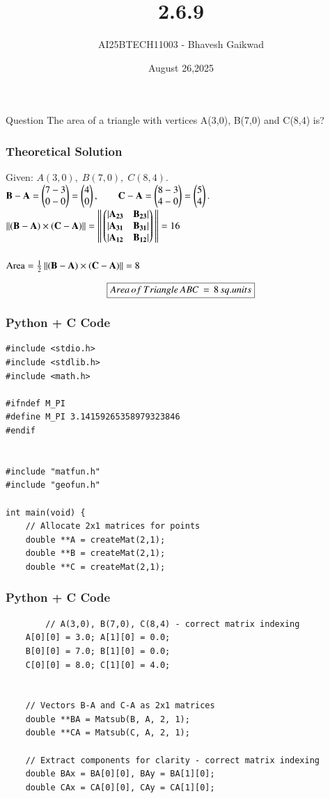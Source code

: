 \documentclass{beamer}
\title
{2.6.9}
\date{August 26,2025}
\author 
{AI25BTECH11003 - Bhavesh Gaikwad}
\begin{document}
\frame{\titlepage}
\begin{frame}{Question}
\centering
The area of a triangle with vertices A(3,0), B(7,0) and C(8,4) is?
\end{frame}


\begin{frame}[fragile]
    \frametitle{Theoretical Solution}
Given: $A(3,0),\; B(7,0),\; C(8,4).$\\

$
\mathbf{B}-\mathbf{A}=\begin{pmatrix}7-3\\0-0\end{pmatrix}
=\begin{pmatrix}4\\0\end{pmatrix},\qquad
\mathbf{C}-\mathbf{A}=\begin{pmatrix}8-3\\4-0\end{pmatrix} = \begin{pmatrix}5\\4\end{pmatrix}.
$\\

$\left\lVert\mathbf{(B-A)} \times \mathbf{(C-A)}\right\rVert = \left\lVert\,\begin{pmatrix}|\mathbf{A_{23}} & \mathbf{B_{23}}| \\ |\mathbf{A_{31}} & \mathbf{B_{31}}| \\ |\mathbf{A_{12}} & \mathbf{B_{12}}|\end{pmatrix}\,\right\rVert = 16 $\\\\


$
\text{Area}=\frac{1}{2}\left\lVert\mathbf{(B-A)} \times \mathbf{(C-A)}\right\rVert = 8
$

\begin{align}
    \centering
    \boxed{Area \, of \, Triangle \, ABC \,= \,8\,sq.units}
\end{align}

\end{frame}


\begin{frame}[fragile]
    \frametitle{Python + C Code}
    \begin{lstlisting}
#include <stdio.h>
#include <stdlib.h>
#include <math.h>

#ifndef M_PI
#define M_PI 3.14159265358979323846
#endif


#include "matfun.h"
#include "geofun.h"

int main(void) {
    // Allocate 2x1 matrices for points
    double **A = createMat(2,1);
    double **B = createMat(2,1);
    double **C = createMat(2,1);
    \end{lstlisting}
\end{frame}


\begin{frame}[fragile]
    \frametitle{Python + C Code}
    \begin{lstlisting}
        // A(3,0), B(7,0), C(8,4) - correct matrix indexing
    A[0][0] = 3.0; A[1][0] = 0.0;
    B[0][0] = 7.0; B[1][0] = 0.0;
    C[0][0] = 8.0; C[1][0] = 4.0;


    // Vectors B-A and C-A as 2x1 matrices
    double **BA = Matsub(B, A, 2, 1);
    double **CA = Matsub(C, A, 2, 1);

    // Extract components for clarity - correct matrix indexing
    double BAx = BA[0][0], BAy = BA[1][0];
    double CAx = CA[0][0], CAy = CA[1][0];
    \end{lstlisting}
\end{frame}
\end{document}
